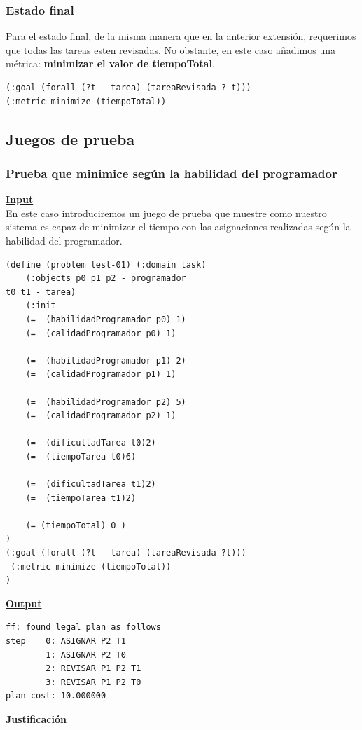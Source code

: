 \documentclass[11pt]{article}
\begin{document}
\subsubsection{Estado final}
Para el estado final, de la misma manera que en la anterior extensión, requerimos que todas las tareas esten revisadas. No obstante, en este caso añadimos una métrica: \textbf{minimizar el valor de tiempoTotal}.
\begin{verbatim}
(:goal (forall (?t - tarea) (tareaRevisada ? t))) 
(:metric minimize (tiempoTotal))
\end{verbatim}

\subsection{Juegos de prueba}
\subsubsection{Prueba que minimice según la habilidad del programador} 
\underline{\textbf{Input}}
\\

En este caso introduciremos un juego de prueba que muestre como nuestro sistema es capaz de minimizar el tiempo con las asignaciones realizadas según la habilidad del programador. 
\begin{verbatim}
(define (problem test-01) (:domain task) 
	(:objects p0 p1 p2 - programador
t0 t1 - tarea)
	(:init
	(=  (habilidadProgramador p0) 1)
	(=  (calidadProgramador p0) 1)

	(=  (habilidadProgramador p1) 2)
	(=  (calidadProgramador p1) 1)

	(=  (habilidadProgramador p2) 5)
	(=  (calidadProgramador p2) 1)

	(=  (dificultadTarea t0)2)
	(=  (tiempoTarea t0)6)

	(=  (dificultadTarea t1)2)
	(=  (tiempoTarea t1)2)

	(= (tiempoTotal) 0 )
)
(:goal (forall (?t - tarea) (tareaRevisada ?t)))
 (:metric minimize (tiempoTotal))
)

\end{verbatim}

\noindent \underline{\textbf{Output}}
\\

\begin{verbatim}
ff: found legal plan as follows
step    0: ASIGNAR P2 T1
        1: ASIGNAR P2 T0
        2: REVISAR P1 P2 T1
        3: REVISAR P1 P2 T0
plan cost: 10.000000
\end{verbatim}
\noindent \underline{{\textbf{Justificación}}}
\\
\end{document}
